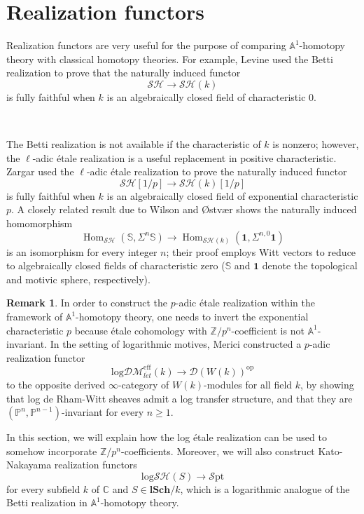 \documentclass[11pt, a4paper]{amsart}
\theoremstyle{definition}
\newtheorem{rmk}[thm]{Remark}
\numberwithin{equation}{subsection}
\newcommand{\Z}{\mathbb{Z}}
\newcommand{\C}{\mathbb{C}}
\renewcommand{\P}{\mathbb{P}}
\newcommand{\A}{\mathbb{A}}
\newcommand{\lSch}{\mathbf{lSch}}
\renewcommand{\hom}{\operatorname{Hom}}				 %
\newcommand{\Sphere}{\mathbb{S}}
\newcommand{\leta}{{l\acute{e}t}}
\newcommand{\infSpt}{\mathcal{S}\mathrm{pt}}
\newcommand{\unit}{\mathbf{1}}
\newcommand{\infD}{\mathcal{D}}
\newcommand{\infSH}{\mathcal{SH}}
\newcommand{\inflogSH}{\mathrm{log}\mathcal{SH}}
\newcommand{\inflogDMeff}{\mathrm{log}\mathcal{DM}^{\mathrm{eff}}}
\begin{document}
\newpage


\section{Realization functors}
\label{section:rf}
Realization functors are very useful for the purpose of comparing $\A^1$-homotopy theory with 
classical homotopy theories.
For example, 
Levine \cite{zbMATH06366499} used the Betti realization to prove that the naturally induced functor
\[
\infSH\to \infSH(k)
\]
is fully faithful when $k$ is an algebraically closed field of characteristic $0$.

\

The Betti realization is not available if the characteristic of $k$ is nonzero;
however, the $\ell$-adic \'etale realization is a useful replacement in positive characteristic.
Zargar \cite{zbMATH07103864} used the $\ell$-adic \'etale realization to prove the naturally induced  functor
\[
\infSH[1/p] \to \infSH(k)[1/p]
\]
is fully faithful when $k$ is an algebraically closed field of exponential characteristic $p$.
A closely related result due to Wilson and {\O}stv{\ae}r \cite{zbMATH06698209} shows the naturally induced homomorphism
\[
\hom_{\infSH}(\Sphere,\Sigma^n \Sphere)
\to
\hom_{\infSH(k)}(\unit,\Sigma^{n,0}\unit)
\]
is an isomorphism for every integer $n$; 
their proof employs Witt vectors to reduce to algebraically closed fields of characteristic zero 
($\Sphere$ and $\unit$ denote the topological and motivic sphere, respectively).


\begin{rmk}In order to construct the $p$-adic \'etale realization within the framework of $\A^1$-homotopy theory,
one needs to invert the exponential characteristic $p$ because \'etale cohomology with 
$\Z/p^n$-coefficient is not $\A^1$-invariant.
In the setting of logarithmic motives, 
Merici \cite{2211.14303} constructed a $p$-adic realization functor
\[
\inflogDMeff_{\leta}(k)\to \infD(W(k))^\mathrm{op}
\]
to the opposite derived $\infty$-category of $W(k)$-modules for all field $k$, 
by showing that log de Rham-Witt sheaves admit a log transfer structure, and that they are $(\P^n, \P^{n-1})$-invariant for every $n\geq1$.
\end{rmk}
In this section, 
we will explain how the log \'etale realization can be used to somehow incorporate $\Z/p^n$-coefficients.
Moreover, 
we will also construct
Kato-Nakayama realization functors
\[
\inflogSH(S)\to \infSpt
\]
for every subfield $k$ of $\C$ and $S\in \lSch/k$, 
which is a logarithmic analogue of the Betti realization in $\A^1$-homotopy theory.
\end{document}
